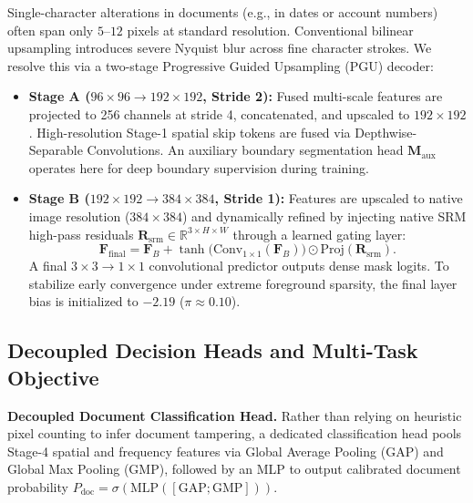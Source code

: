 Single-character alterations in documents (e.g., in dates or account numbers) often span only $5$--$12$ pixels at standard resolution. Conventional bilinear upsampling introduces severe Nyquist blur across fine character strokes. We resolve this via a two-stage Progressive Guided Upsampling (PGU) decoder:
\begin{itemize}
    \item \textbf{Stage A ($96 \times 96 \to 192 \times 192$, Stride 2):} Fused multi-scale features are projected to 256 channels at stride 4, concatenated, and upscaled to $192 \times 192$. High-resolution Stage-1 spatial skip tokens are fused via Depthwise-Separable Convolutions. An auxiliary boundary segmentation head $\mathbf{M}_{\text{aux}}$ operates here for deep boundary supervision during training.
    \item \textbf{Stage B ($192 \times 192 \to 384 \times 384$, Stride 1):} Features are upscaled to native image resolution ($384 \times 384$) and dynamically refined by injecting native SRM high-pass residuals $\mathbf{R}_{\text{srm}} \in \mathbb{R}^{3 \times H \times W}$ through a learned gating layer:
    \begin{equation}
        \mathbf{F}_{\text{final}} = \mathbf{F}_B + \tanh\Big(\text{Conv}_{1 \times 1}(\mathbf{F}_B)\Big) \odot \text{Proj}(\mathbf{R}_{\text{srm}}).
    \end{equation}
    A final $3 \times 3 \to 1 \times 1$ convolutional predictor outputs dense mask logits. To stabilize early convergence under extreme foreground sparsity, the final layer bias is initialized to $-2.19$ ($\pi \approx 0.10$).
\end{itemize}

\subsection{Decoupled Decision Heads and Multi-Task Objective}
\label{subsec:heads_and_loss}

\noindent\textbf{Decoupled Document Classification Head.} 
Rather than relying on heuristic pixel counting to infer document tampering, a dedicated classification head pools Stage-4 spatial and frequency features via Global Average Pooling (GAP) and Global Max Pooling (GMP), followed by an MLP to output calibrated document probability $P_{\text{doc}} = \sigma(\text{MLP}([\text{GAP}; \text{GMP}]))$.

